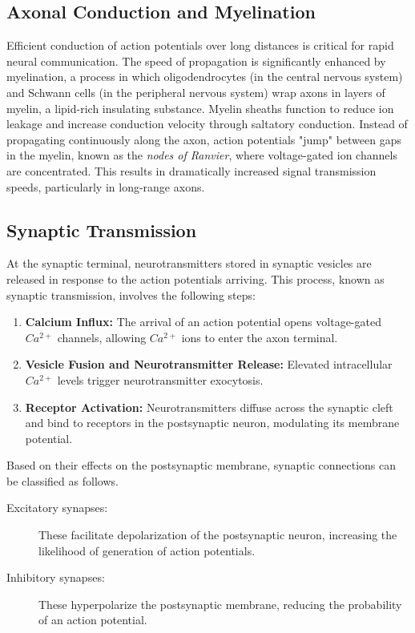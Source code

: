 \subsection{Axonal Conduction and Myelination}
\label{subsec:axonal_conduction}
Efficient conduction of action potentials over long distances is critical for
rapid neural communication. The speed of propagation is significantly enhanced by
myelination, a process in which oligodendrocytes (in the central nervous system) 
and Schwann cells (in the peripheral nervous system) wrap axons in layers of myelin, 
a lipid-rich insulating substance. Myelin sheaths function to reduce ion leakage and
increase conduction velocity through saltatory conduction. Instead of propagating
continuously along the axon, action potentials "jump" between gaps in the myelin, 
known as the \emph{nodes of Ranvier}, where voltage-gated ion channels are concentrated. 
This results in dramatically increased signal transmission speeds, particularly
in long-range axons.

\subsection{Synaptic Transmission}
\label{subsec:synaptic_transmission}
At the synaptic terminal, neurotransmitters stored in synaptic vesicles are released
in response to the action potentials arriving. This process, known as synaptic transmission,
involves the following steps:

\begin{enumerate}
    \item \textbf{Calcium Influx:} The arrival of an action potential opens voltage-gated 
    $Ca^{2+}$ channels, allowing $Ca^{2+}$ ions to enter the axon terminal.
    \item \textbf{Vesicle Fusion and Neurotransmitter Release:} Elevated intracellular $Ca^{2+}$ levels trigger neurotransmitter exocytosis.
    \item \textbf{Receptor Activation:} Neurotransmitters diffuse across the synaptic cleft and bind to receptors in the postsynaptic neuron, modulating its membrane potential. 
\end{enumerate}

Based on their effects on the postsynaptic membrane, synaptic connections can be classified as follows.
\begin{description}
    \item[Excitatory synapses:] These facilitate depolarization of the postsynaptic neuron, increasing the likelihood of generation of action potentials.
    \item[Inhibitory synapses:] These hyperpolarize the postsynaptic membrane, reducing the probability of an action potential.
\end{description}

